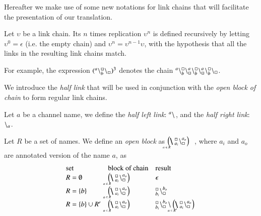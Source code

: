Hereafter we make use of some new notations for link chains that will facilitate  
the presentation of our translation.
\begin{definition}[Replication]
Let $\upsilon$ be a link chain. Its $n$ times replication $\upsilon^n$ is defined recursively by letting
$\upsilon^0 = \epsilon$ (i.e. the empty chain) and $\upsilon^n = \upsilon^{n-1}\upsilon$,
with the hypothesis that all the links in the resulting link chains match.
\end{definition}

For example,  the expression $({}^{a}\backslash_{b}^{\scriptstyle {\square}}\backslash_{\scriptstyle {\square}})^3$  denotes the chain ${}^{a}\backslash_{b}^{\scriptstyle {\square}}\backslash_{\scriptstyle {\square}}^{a}\backslash_{b}^{\scriptstyle {\square}}\backslash_{\scriptstyle {\square}}^{a}\backslash_{b}^{\scriptstyle {\square}}\backslash_{\scriptstyle {\square}}$.

 \noindent
We introduce the \emph{half link} that will be used in conjunction with the \emph{open block of chain} to form regular link chains.

\begin{definition}
Let $a$ be a channel name, we define the \emph{half left link}:  ${}^{a} \backslash_{}$,   and the  \emph{half right link}: ${}^{} \backslash_{a}$.
\end{definition}

\begin{definition}
Let $R$ be a set of names. We 
define an \emph{open block} as $\blockchain{a_i}{a_o}{a \in R}$\ , where $a_i$ and $a_o$ are annotated version of the name $a$, as
\[
\begin{array}{l@{\quad}l@{\quad}l}
\mbox{set}& \mbox{block of chain}& \mbox{result}\\
R= \emptyset & \blockchain{a_i}{a_o}{a \in R}   &\epsilon\\
R = \{ b\}    &\blockchain{a_i}{a_o}{a \in R}  & {}_{b_i}^{\noact}\chainedlink{\noact}{b_o}\\
R = \{b\} \cup R' & \blockchain{a_i}{a_o}{a \in R} & {}_{b_i}^{\noact}\chainedlink{\noact}{b_o}\link{}{}\blockchain{a_i}{a_o}{a \in R'}
\end{array}
\]
\end{definition}


